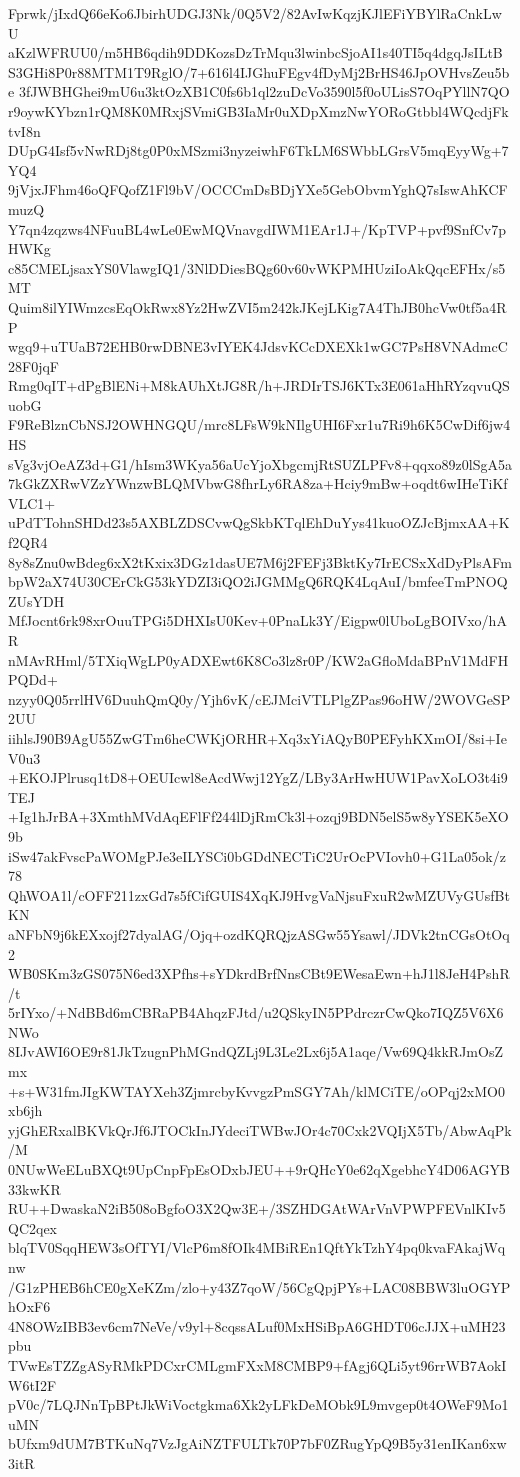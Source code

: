 Fprwk/jIxdQ66eKo6JbirhUDGJ3Nk/0Q5V2/82AvIwKqzjKJlEFiYBYlRaCnkLwU
aKzlWFRUU0/m5HB6qdih9DDKozsDzTrMqu3lwinbcSjoAI1s40TI5q4dgqJsILtB
S3GHi8P0r88MTM1T9RglO/7+616l4IJGhuFEgv4fDyMj2BrHS46JpOVHvsZeu5be
3fJWBHGhei9mU6u3ktOzXB1C0fs6b1ql2zuDcVo3590l5f0oULisS7OqPYllN7QO
r9oywKYbzn1rQM8K0MRxjSVmiGB3IaMr0uXDpXmzNwYORoGtbbl4WQcdjFktvI8n
DUpG4Isf5vNwRDj8tg0P0xMSzmi3nyzeiwhF6TkLM6SWbbLGrsV5mqEyyWg+7YQ4
9jVjxJFhm46oQFQofZ1Fl9bV/OCCCmDsBDjYXe5GebObvmYghQ7sIswAhKCFmuzQ
Y7qn4zqzws4NFuuBL4wLe0EwMQVnavgdIWM1EAr1J+/KpTVP+pvf9SnfCv7pHWKg
c85CMELjsaxYS0VlawgIQ1/3NlDDiesBQg60v60vWKPMHUziIoAkQqcEFHx/s5MT
Quim8ilYIWmzcsEqOkRwx8Yz2HwZVI5m242kJKejLKig7A4ThJB0hcVw0tf5a4RP
wgq9+uTUaB72EHB0rwDBNE3vIYEK4JdsvKCcDXEXk1wGC7PsH8VNAdmcC28F0jqF
Rmg0qIT+dPgBlENi+M8kAUhXtJG8R/h+JRDIrTSJ6KTx3E061aHhRYzqvuQSuobG
F9ReBlznCbNSJ2OWHNGQU/mrc8LFsW9kNIlgUHI6Fxr1u7Ri9h6K5CwDif6jw4HS
sVg3vjOeAZ3d+G1/hIsm3WKya56aUcYjoXbgcmjRtSUZLPFv8+qqxo89z0lSgA5a
7kGkZXRwVZzYWnzwBLQMVbwG8fhrLy6RA8za+Hciy9mBw+oqdt6wIHeTiKfVLC1+
uPdTTohnSHDd23s5AXBLZDSCvwQgSkbKTqlEhDuYys41kuoOZJcBjmxAA+Kf2QR4
8y8sZnu0wBdeg6xX2tKxix3DGz1dasUE7M6j2FEFj3BktKy7IrECSxXdDyPlsAFm
bpW2aX74U30CErCkG53kYDZI3iQO2iJGMMgQ6RQK4LqAuI/bmfeeTmPNOQZUsYDH
MfJocnt6rk98xrOuuTPGi5DHXIsU0Kev+0PnaLk3Y/Eigpw0lUboLgBOIVxo/hAR
nMAvRHml/5TXiqWgLP0yADXEwt6K8Co3lz8r0P/KW2aGfloMdaBPnV1MdFHPQDd+
nzyy0Q05rrlHV6DuuhQmQ0y/Yjh6vK/cEJMciVTLPlgZPas96oHW/2WOVGeSP2UU
iihlsJ90B9AgU55ZwGTm6heCWKjORHR+Xq3xYiAQyB0PEFyhKXmOI/8si+IeV0u3
+EKOJPlrusq1tD8+OEUIcwl8eAcdWwj12YgZ/LBy3ArHwHUW1PavXoLO3t4i9TEJ
+Ig1hJrBA+3XmthMVdAqEFlFf244lDjRmCk3l+ozqj9BDN5elS5w8yYSEK5eXO9b
iSw47akFvscPaWOMgPJe3eILYSCi0bGDdNECTiC2UrOcPVIovh0+G1La05ok/z78
QhWOA1l/cOFF211zxGd7s5fCifGUIS4XqKJ9HvgVaNjsuFxuR2wMZUVyGUsfBtKN
aNFbN9j6kEXxojf27dyalAG/Ojq+ozdKQRQjzASGw55Ysawl/JDVk2tnCGsOtOq2
WB0SKm3zGS075N6ed3XPfhs+sYDkrdBrfNnsCBt9EWesaEwn+hJ1l8JeH4PshR/t
5rIYxo/+NdBBd6mCBRaPB4AhqzFJtd/u2QSkyIN5PPdrczrCwQko7IQZ5V6X6NWo
8IJvAWI6OE9r81JkTzugnPhMGndQZLj9L3Le2Lx6j5A1aqe/Vw69Q4kkRJmOsZmx
+s+W31fmJIgKWTAYXeh3ZjmrcbyKvvgzPmSGY7Ah/klMCiTE/oOPqj2xMO0xb6jh
yjGhERxalBKVkQrJf6JTOCkInJYdeciTWBwJOr4c70Cxk2VQIjX5Tb/AbwAqPk/M
0NUwWeELuBXQt9UpCnpFpEsODxbJEU++9rQHcY0e62qXgebhcY4D06AGYB33kwKR
RU++DwaskaN2iB508oBgfoO3X2Qw3E+/3SZHDGAtWArVnVPWPFEVnlKIv5QC2qex
blqTV0SqqHEW3sOfTYI/VlcP6m8fOIk4MBiREn1QftYkTzhY4pq0kvaFAkajWqnw
/G1zPHEB6hCE0gXeKZm/zlo+y43Z7qoW/56CgQpjPYs+LAC08BBW3luOGYPhOxF6
4N8OWzIBB3ev6cm7NeVe/v9yl+8cqssALuf0MxHSiBpA6GHDT06cJJX+uMH23pbu
TVwEsTZZgASyRMkPDCxrCMLgmFXxM8CMBP9+fAgj6QLi5yt96rrWB7AokIW6tI2F
pV0c/7LQJNnTpBPtJkWiVoctgkma6Xk2yLFkDeMObk9L9mvgep0t4OWeF9Mo1uMN
bUfxm9dUM7BTKuNq7VzJgAiNZTFULTk70P7bF0ZRugYpQ9B5y31enIKan6xw3itR
